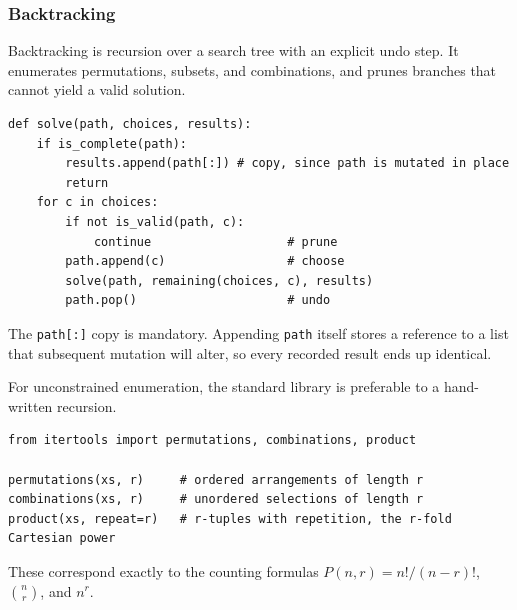 \subsubsection*{Backtracking}

Backtracking is recursion over a search tree with an explicit undo step. It
enumerates permutations, subsets, and combinations, and prunes branches that
cannot yield a valid solution.

\newpage

\begin{lstlisting}[style=python, caption={Backtracking skeleton}]
def solve(path, choices, results):
    if is_complete(path):
        results.append(path[:]) # copy, since path is mutated in place
        return
    for c in choices:
        if not is_valid(path, c):
            continue                   # prune
        path.append(c)                 # choose
        solve(path, remaining(choices, c), results)
        path.pop()                     # undo
\end{lstlisting}

The \texttt{path[:]} copy is mandatory. Appending \texttt{path} itself stores a
reference to a list that subsequent mutation will alter, so every recorded
result ends up identical.

For unconstrained enumeration, the standard library is preferable to a
hand-written recursion.

\begin{lstlisting}[style=python, caption={Enumeration without recursion}]
from itertools import permutations, combinations, product

permutations(xs, r)     # ordered arrangements of length r
combinations(xs, r)     # unordered selections of length r
product(xs, repeat=r)   # r-tuples with repetition, the r-fold Cartesian power
\end{lstlisting}

These correspond exactly to the counting formulas $P(n,r) = n!/(n-r)!$,
$\binom{n}{r}$, and $n^r$.
